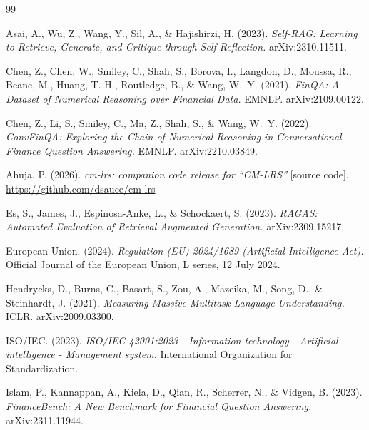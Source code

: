 \documentclass[11pt]{article}
\begin{document}


\begin{thebibliography}{99}

Asai, A., Wu, Z., Wang, Y., Sil, A., \& Hajishirzi, H. (2023).
\textit{Self-RAG: Learning to Retrieve, Generate, and Critique through Self-Reflection.} arXiv:2310.11511.

Chen, Z., Chen, W., Smiley, C., Shah, S., Borova, I., Langdon, D., Moussa, R., Beane, M., Huang, T.-H., Routledge, B., \& Wang, W.~Y. (2021).
\textit{FinQA: A Dataset of Numerical Reasoning over Financial Data.} EMNLP. arXiv:2109.00122.

Chen, Z., Li, S., Smiley, C., Ma, Z., Shah, S., \& Wang, W.~Y. (2022).
\textit{ConvFinQA: Exploring the Chain of Numerical Reasoning in Conversational Finance Question Answering.} EMNLP. arXiv:2210.03849.

Ahuja, P. (2026).
\textit{cm-lrs: companion code release for ``CM-LRS''} [source code]. \url{https://github.com/dsauce/cm-lrs}

Es, S., James, J., Espinosa-Anke, L., \& Schockaert, S. (2023).
\textit{RAGAS: Automated Evaluation of Retrieval Augmented Generation.} arXiv:2309.15217.

European Union. (2024).
\textit{Regulation (EU) 2024/1689 (Artificial Intelligence Act).} Official Journal of the European Union, L series, 12 July 2024.

Hendrycks, D., Burns, C., Basart, S., Zou, A., Mazeika, M., Song, D., \& Steinhardt, J. (2021).
\textit{Measuring Massive Multitask Language Understanding.} ICLR. arXiv:2009.03300.

ISO/IEC. (2023).
\textit{ISO/IEC 42001:2023 - Information technology - Artificial intelligence - Management system.} International Organization for Standardization.

Islam, P., Kannappan, A., Kiela, D., Qian, R., Scherrer, N., \& Vidgen, B. (2023).
\textit{FinanceBench: A New Benchmark for Financial Question Answering.} arXiv:2311.11944.


\end{thebibliography}
\end{document}
